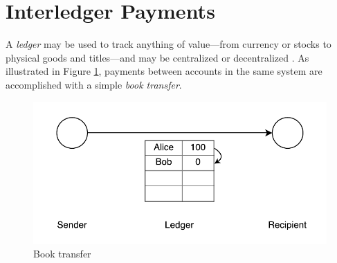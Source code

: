 \documentclass[letterpaper,twocolumn,10pt]{article}
\begin{document}
\section{Interledger Payments}
\label{sec:model}

                 
A \textit{ledger} may be used to track anything of value---from currency or stocks to physical goods and titles---and may be centralized or decentralized \cite{Bitcoin}. As illustrated in Figure \ref{fig:three-bells}, payments between accounts in the same system are accomplished with a simple \textit{book transfer}.

\begin{figure}[ht]
    \centering
    \includegraphics[width=\columnwidth]{figures/three-bells.pdf}
    \caption{Book transfer}
    \label{fig:three-bells}
\end{figure}


\end{document}
